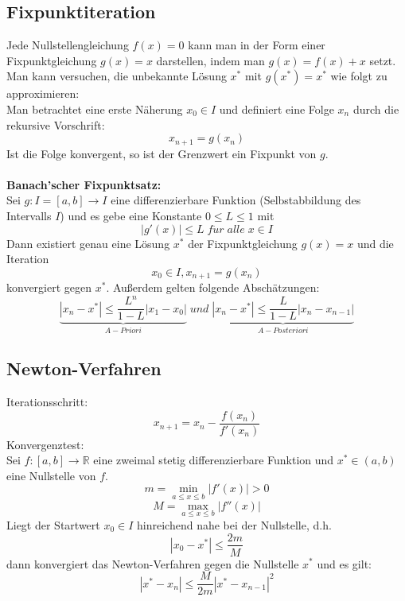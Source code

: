 \documentclass[a4paper,twocolumn,10pt]{article}
\begin{document}
\subsection{Fixpunktiteration}
Jede Nullstellengleichung $f(x)=0$ kann man in der Form einer Fixpunktgleichung $g(x)=x$ darstellen, indem man $g(x)=f(x)+x$ setzt. Man kann versuchen, die unbekannte Lösung $x^*$ mit $g(x^*)=x^*$ wie folgt zu approximieren:\\
Man betrachtet eine erste Näherung $x_0\in I$ und definiert eine Folge $x_n$ durch die rekursive Vorschrift:
\begin{equation*}
x_{n+1}=g(x_n)
\end{equation*}
Ist die Folge konvergent, so ist der Grenzwert ein Fixpunkt von $g$.\\\\
\textbf{Banach'scher Fixpunktsatz:}\\
Sei $g:I=[a,b]\rightarrow I$ eine differenzierbare Funktion (Selbstabbildung des Intervalls $I$) und es gebe eine Konstante $0\leq L\leq 1$ mit
\begin{equation*}
|g'(x)|\leq L\;f\ddot{u}r\; alle\;x\in I
\end{equation*}
Dann existiert genau eine Lösung $x^*$ der Fixpunktgleichung $g(x)=x$ und die Iteration
\begin{equation*}
x_0\in I, x_{n+1}=g(x_n)
\end{equation*}
konvergiert gegen $x^*$. Außerdem gelten folgende Abschätzungen:
\begin{equation*}
\underbrace{|x_n-x^*|\leq \frac{L^n}{1-L}|x_1-x_0|}_{A-Priori}\;und\;\underbrace{|x_n-x^*|\leq \frac{L}{1-L}|x_n-x_{n-1}|}_{A-Posteriori}
\end{equation*}

\subsection{Newton-Verfahren}
Iterationsschritt:
\begin{equation*}
x_{n+1}=x_n-\frac{f(x_n)}{f'(x_n)}
\end{equation*}
Konvergenztest:\\
Sei $f:[a,b]\rightarrow\mathbb{R}$ eine zweimal stetig differenzierbare Funktion und $x^*\in (a,b)$ eine Nullstelle von $f$.
\begin{equation*}
m=\min\limits_{a\leq x\leq b}|f'(x)|>0
\end{equation*}
\begin{equation*}
M=\max\limits_{a\leq x\leq b}|f''(x)|
\end{equation*}
Liegt der Startwert $x_0\in I$ hinreichend nahe bei der Nullstelle, d.h.
\begin{equation*}
|x_0-x^*|\leq \frac{2m}{M}
\end{equation*}
dann konvergiert das Newton-Verfahren gegen die Nullstelle $x^*$ und es gilt:
\begin{equation*}
|x^*-x_n|\leq \frac{M}{2m}|x^*-x_{n-1}|^2
\end{equation*}
\end{document}
